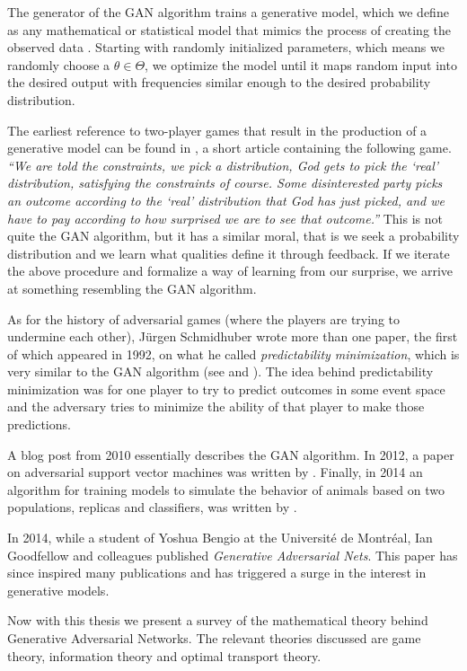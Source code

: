 The generator of the GAN algorithm trains a generative model, which we define as
any mathematical or statistical model that mimics the process of creating the
observed data \cite{ref:bishop}. Starting with randomly initialized parameters,
which means we randomly choose a $\theta \in \Theta$, we optimize the model
until it maps random input into the desired output with frequencies similar
enough to the desired probability distribution.

The earliest reference to two-player games that result in the production of a
generative model can be found in \cite{ref:doyle}, a short article containing
the following game. \textit{``We are told the constraints, we pick a
  distribution, God gets to pick the `real' distribution, satisfying the
  constraints of course. Some disinterested party picks an outcome according to
  the `real' distribution that God has just picked, and we have to pay according
  to how surprised we are to see that outcome.''} This is not quite the GAN
algorithm, but it has a similar moral, that is we seek a probability
distribution and we learn what qualities define it through feedback. If we
iterate the above procedure and formalize a way of learning from our surprise,
we arrive at something resembling the GAN algorithm.

As for the history of adversarial games (where the players are trying to
undermine each other), J\"{u}rgen Schmidhuber wrote more than one paper, the
first of which appeared in 1992, on what he called \textit{predictability
  minimization}, which is very similar to the GAN algorithm (see
\cite{ref:schmidhuber-1992} and \cite{ref:schmidhuber-2018}). The idea behind
predictability minimization was for one player to try to predict outcomes in
some event space and the adversary tries to minimize the ability of that player
to make those predictions.

A blog post from 2010 \cite{ref:niemitalo-2010} essentially describes the GAN
algorithm. In 2012, a paper on adversarial support vector machines was written
by \cite{ref:zhou-2012}. Finally, in 2014 an algorithm for training models to
simulate the behavior of animals based on two populations, replicas and
classifiers, was written by \cite{ref:li-2014}.

In 2014, while a student of Yoshua Bengio at the Universit\'{e} de Montr\'{e}al,
Ian Goodfellow and colleagues published \textit{Generative Adversarial Nets}.
This paper has since inspired many publications and has triggered a surge in the
interest in generative models.

Now with this thesis we present a survey of the mathematical theory behind
Generative Adversarial Networks. The relevant theories discussed are game
theory, information theory and optimal transport theory.

